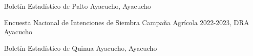 
\begin{scholarship}

	{Boletín Estadístico de Palto Ayacucho, Ayacucho}

	{Encuesta Nacional de Intenciones de Siembra Campaña Agrícola 2022-2023, DRA Ayacucho}

	{Boletín Estadístico de Quinua Ayacucho, Ayacucho}

\end{scholarship}